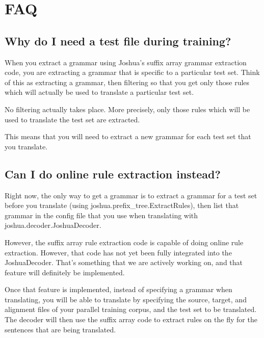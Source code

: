 \chapter{FAQ}

\section{Why do I need a test file during training?}

When you extract a grammar using Joshua's suffix array grammar extraction code, you are extracting a grammar that is specific to a particular test set. Think of this as extracting a grammar, then filtering so that you get only those rules which will actually be used to translate a particular test set.

No filtering actually takes place. More precisely, only those rules which will be used to translate the test set are extracted.

This means that you will need to extract a new grammar for each test set that you translate.


\section{Can I do online rule extraction instead?}

Right now, the only way to get a grammar is to extract a grammar for a test set before you translate (using joshua.prefix\_tree.ExtractRules), then list that grammar in the config file that you use when translating with joshua.decoder.JoshuaDecoder.

However, the suffix array rule extraction code is capable of doing online rule extraction. However, that code has not yet been fully integrated into the JoshuaDecoder. That's something that we are actively working on, and that feature will definitely be implemented.

Once that feature is implemented, instead of specifying a grammar when translating, you will be able to translate by specifying the source, target, and alignment files of your parallel training corpus, and the test set to be translated. The decoder will then use the suffix array code to extract rules on the fly for the sentences that are being translated.

